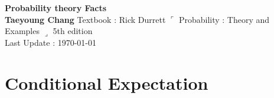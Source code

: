 \documentclass[12pt, A4]{article}
\begin{document}
\begin{titlepage}
	\begin{center}
		\vspace*{5cm}
		\textbf{\Large Probability theory \MakeUppercase{} Facts}
		\\
		\vspace{1.5cm}
		\textbf{Taeyoung Chang}
		\vfill
		Textbook : Rick Durrett $\ulcorner$ Probability : Theory and Examples $\lrcorner$ 5th edition
		\\
		\vspace{0.8cm}
		Last Update : \today
		\vspace*{3cm}
		\thispagestyle{empty}
	\end{center}
\end{titlepage}
\tableofcontents
\clearpage

\section{Conditional Expectation}
\smallskip
\end{document}
